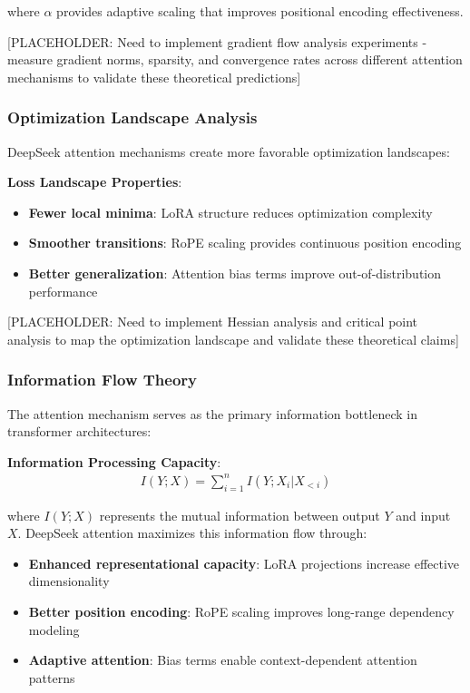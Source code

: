 \documentclass[11pt,a4paper]{article}
\begin{document}
where $\alpha$ provides adaptive scaling that improves positional encoding effectiveness.

[PLACEHOLDER: Need to implement gradient flow analysis experiments - measure gradient norms, sparsity, and convergence rates across different attention mechanisms to validate these theoretical predictions]

\subsubsection{Optimization Landscape Analysis}

DeepSeek attention mechanisms create more favorable optimization landscapes:

\textbf{Loss Landscape Properties}:
\begin{itemize}
    \item \textbf{Fewer local minima}: LoRA structure reduces optimization complexity
    \item \textbf{Smoother transitions}: RoPE scaling provides continuous position encoding
    \item \textbf{Better generalization}: Attention bias terms improve out-of-distribution performance
\end{itemize}

[PLACEHOLDER: Need to implement Hessian analysis and critical point analysis to map the optimization landscape and validate these theoretical claims]

\subsubsection{Information Flow Theory}

The attention mechanism serves as the primary information bottleneck in transformer architectures:

\textbf{Information Processing Capacity}:
\begin{align}
I(Y; X) = \sum_{i=1}^{n} I(Y; X_i | X_{<i})
\end{align}

where $I(Y; X)$ represents the mutual information between output $Y$ and input $X$. DeepSeek attention maximizes this information flow through:

\begin{itemize}
    \item \textbf{Enhanced representational capacity}: LoRA projections increase effective dimensionality
    \item \textbf{Better position encoding}: RoPE scaling improves long-range dependency modeling
    \item \textbf{Adaptive attention}: Bias terms enable context-dependent attention patterns
\end{itemize}
\end{document}

